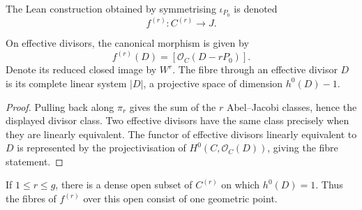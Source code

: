 \begin{definition}
  \label{def:symmetric_product_to_jacobian_morphism}

  The Lean construction obtained by symmetrising \(\iota_{P_0}\) is denoted
  \[
    f^{(r)}\colon C^{(r)}\longrightarrow J.
  \]
\end{definition}

\begin{lemma}
  \label{lem:symmetric_product_to_jacobian_formula}

  On effective divisors, the canonical morphism is given by
  \[
    f^{(r)}(D)=[\mathcal O_C(D-rP_0)].
  \]
  Denote its reduced closed image by \(W^r\).  The fibre through an
  effective divisor \(D\) is its complete linear system \(|D|\), a projective
  space of dimension \(h^0(D)-1\).
\end{lemma}

\begin{proof}
  Pulling back along \(\pi_r\) gives the sum of the \(r\) Abel--Jacobi
  classes, hence the displayed divisor class.  Two effective divisors have
  the same class precisely when they are linearly equivalent.  The functor
  of effective divisors linearly equivalent to \(D\) is represented by the
  projectivisation of \(H^0(C,\mathcal O_C(D))\), giving the fibre statement.
\end{proof}

\begin{lemma}
  \label{lem:symmetric_product_general_divisor}

  If \(1\le r\le g\), there is a dense open subset of \(C^{(r)}\) on which
  \(h^0(D)=1\).  Thus the fibres of \(f^{(r)}\) over this open consist of one
  geometric point.
\end{lemma}

